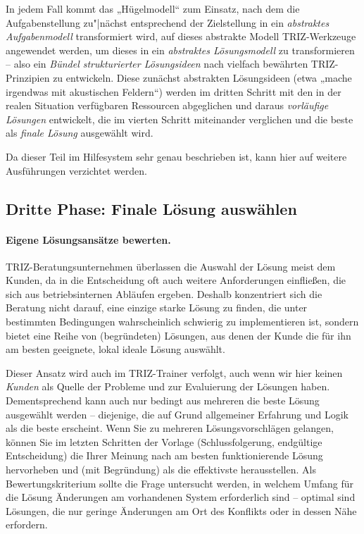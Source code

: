 \documentclass[11pt,a4paper]{article}
\begin{document}
In jedem Fall kommt das „Hügelmodell“ zum Einsatz, nach dem die
Aufgabenstellung zu"|nächst entsprechend der Zielstellung in ein
\emph{abstraktes Aufgabenmodell} transformiert wird, auf dieses abstrakte
Modell TRIZ-Werkzeuge angewendet werden, um dieses in ein \emph{abstraktes
  Lösungsmodell} zu transformieren -- also ein \emph{Bündel strukturierter
  Lösungsideen} nach vielfach bewährten TRIZ-Prinzipien zu entwickeln.  Diese
zunächst abstrakten Lösungsideen (etwa „mache irgendwas mit akustischen
Feldern“) werden im dritten Schritt mit den in der realen Situation
verfügbaren Ressourcen abgeglichen und daraus \emph{vorläufige Lösungen}
entwickelt, die im vierten Schritt miteinander verglichen und die beste als
\emph{finale Lösung} ausgewählt wird.

Da dieser Teil im Hilfesystem sehr genau beschrieben ist, kann hier auf
weitere Ausführungen verzichtet werden. 

\subsection{Dritte Phase: Finale Lösung auswählen}

\paragraph{Eigene Lösungsansätze bewerten.}
TRIZ-Beratungsunternehmen überlassen die Auswahl der Lösung meist dem Kunden,
da in die Entscheidung oft auch weitere Anforderungen einfließen, die sich aus
betriebsinternen Abläufen ergeben.  Deshalb konzentriert sich die Beratung
nicht darauf, eine einzige starke Lösung zu finden, die unter bestimmten
Bedingungen wahrscheinlich schwierig zu implementieren ist, sondern bietet
eine Reihe von (begründeten) Lösungen, aus denen der Kunde die für ihn am
besten geeignete, lokal ideale Lösung auswählt.
 
Dieser Ansatz wird auch im TRIZ-Trainer verfolgt, auch wenn wir hier keinen
\emph{Kunden} als Quelle der Probleme und zur Evaluierung der Lösungen haben.
Dementsprechend kann auch nur bedingt aus mehreren die beste Lösung ausgewählt
werden -- diejenige, die auf Grund allgemeiner Erfahrung und Logik als die
beste erscheint. Wenn Sie zu mehreren Lösungsvorschlägen gelangen, können Sie
im letzten Schritten der Vorlage (Schlussfolgerung, endgültige Entscheidung)
die Ihrer Meinung nach am besten funktionierende Lösung hervorheben und (mit
Begründung) als die effektivste herausstellen.  Als Bewertungskriterium sollte
die Frage untersucht werden, in welchem Umfang für die Lösung Änderungen am
vorhandenen System erforderlich sind -- optimal sind Lösungen, die nur geringe
Änderungen am Ort des Konflikts oder in dessen Nähe erfordern.
\end{document}
